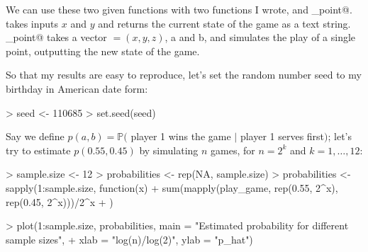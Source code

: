 \documentclass[10pt, oneside, reqno]{article}
\theoremstyle{plain}
\begin{document}
We can use these two given functions with two functions I wrote, \verb@status@ and \verb@play_point@. \verb@status@ takes inputs $x$ and $y$ and returns the current state of the game as a text string. \verb@play_point@ takes a vector \verb@state@$=(x,y,z)$, a and b, and simulates the play of a single point, outputting the new state of the game.


So that my results are easy to reproduce, let's set the random number seed to my birthday in American date form:

\begin{Schunk}
\begin{Sinput}
> seed <- 110685
> set.seed(seed)
\end{Sinput}
\end{Schunk}

Say we define $p(a,b)=\mathbb{P}($ player 1 wins the game $|$ player 1 serves first$)$; let's try to estimate $p(0.55,0.45)$ by simulating $n$ games, for $n=2^k$ and $k=1,\ldots,12$:

\begin{Schunk}
\begin{Sinput}
> sample.size <- 12
> probabilities <- rep(NA, sample.size)
> probabilities <- sapply(1:sample.size, function(x) {
+     sum(mapply(play_game, rep(0.55, 2^x), rep(0.45, 2^x)))/2^x
+ })
\end{Sinput}
\end{Schunk}

\begin{Schunk}
\begin{Sinput}
> plot(1:sample.size, probabilities, main = "Estimated probability for different sample sizes", 
+     xlab = "log(n)/log(2)", ylab = "p_hat")
\end{Sinput}
\end{Schunk}
\end{document}
